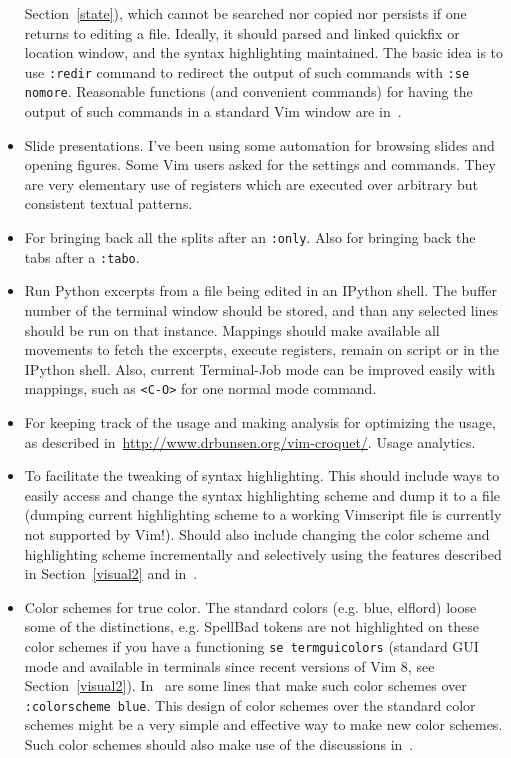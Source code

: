 \documentclass{article}
\newcommand{\ttt}[1] {
	\texttt{<#1>}}
\newcommand{\tttt}[1]{\texttt{#1}}
\begin{document}
\begin{itemize}
        Section~\ref{state}),
        which cannot be searched nor copied nor persists if one
        returns to editing a file.
        Ideally, it should parsed and linked quickfix or location
        window, and the syntax highlighting maintained.
        The basic idea is to use \tttt{:redir} command to redirect the output
        of such commands with \tttt{:se nomore}.
        Reasonable functions (and convenient commands) for having the
        output of such commands in a standard Vim window are
        in~\cite{vimrc}.
      \item Slide presentations. I've been using some automation for browsing
        slides and opening figures. Some Vim users asked for the settings and
        commands. They are very elementary use of registers which are executed over
        arbitrary but consistent textual patterns.
      \item For bringing back all the splits after an \tttt{:only}.
        Also for bringing back the tabs after a \tttt{:tabo}.
      \item Run Python excerpts from a file being edited in an IPython shell. 
        The buffer number of the terminal window should be stored,
        and than any selected lines should be run on that instance.
        Mappings should make available all movements to fetch the
        excerpts, execute registers, remain on script or in the IPython shell.
        Also, current Terminal-Job mode can be improved easily with
        mappings, such as \ttt{C-O} for one normal mode command.
      \item For keeping track of the usage and making analysis
        for optimizing the usage, as described in~\url{http://www.drbunsen.org/vim-croquet/}.
        Usage analytics.
      \item To facilitate the tweaking of syntax highlighting.
        This should include ways to easily access and change the
        syntax highlighting scheme and dump it to a file (dumping
        current highlighting scheme to a working Vimscript file
        is currently not supported by Vim!).
        Should also include changing the color scheme and highlighting scheme incrementally
        and selectively using the features described in Section~\ref{visual2}
        and in~\cite{tokipona}.
      \item Color schemes for true color.
        The standard colors (e.g. blue, elflord) loose some of the distinctions,
        e.g. SpellBad tokens are not highlighted on these color schemes
        if you have a functioning \tttt{se termguicolors} (standard GUI mode
        and available in terminals since recent versions of Vim 8,
        see Section~\ref{visual2}).
        In~\cite{vimrc} are some lines that make such color schemes over
        \tttt{:colorscheme blue}.
        This design of color schemes over the standard color schemes might be
        a very simple and effective way to make new color schemes.
        Such color schemes should also make use of the discussions
        in~\cite{tokipona}.
    \end{itemize}
\end{document}
